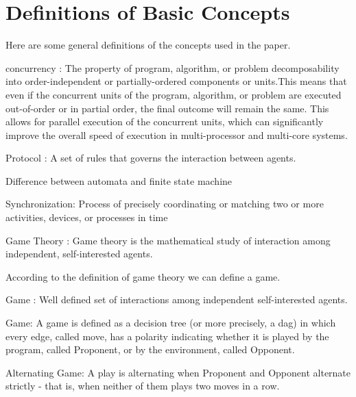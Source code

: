 \section{Definitions of Basic Concepts}
Here are some general definitions of the concepts used in the paper. 
\begin{definition}
	concurrency : The property of program, algorithm, or problem decomposability into order-independent or partially-ordered components or units.This means that even if the concurrent units of the program, algorithm, or problem are executed out-of-order or in partial order, the final outcome will remain the same. This allows for parallel execution of the concurrent units, which can significantly improve the overall speed of execution in multi-processor and multi-core systems.
\end{definition}

\begin{definition}
	Protocol : A set of rules that governs the interaction between agents. 
\end{definition}

Difference between automata and finite state machine
\begin{definition}
	Synchronization:
	Process of precisely coordinating or matching two or more activities, devices, or processes in time
\end{definition}

\begin{definition}
	Game Theory : Game theory is the mathematical study of interaction among independent, self-interested agents. 	
\end{definition}

According to the definition of game theory we can define a game.

\begin{definition}
	Game : Well defined set of interactions among independent self-interested agents.
\end{definition}

\begin{definition}
	Game: A game is defined as a decision tree (or more precisely, a dag) in which every edge, called move, has a polarity indicating whether it is played by the program, called Proponent, or by the environment, called Opponent.
\end{definition}

\begin{definition}
	Alternating Game: A play is alternating when Proponent and Opponent alternate strictly - that is, when neither of them plays two moves in a row.
\end{definition}

